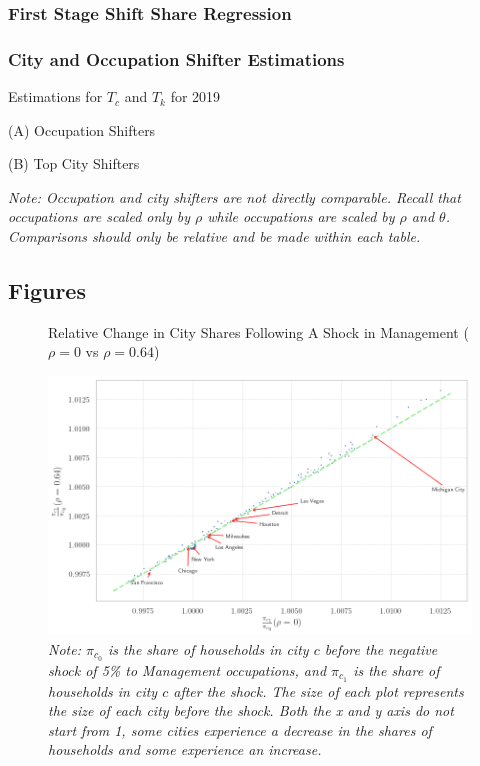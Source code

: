 \documentclass[10pt]{article}
\begin{document}
\subsubsection{First Stage Shift Share Regression}


\newpage

\subsubsection{City and Occupation Shifter Estimations}
\begin{table}[!htb]
    \centering
    \caption{Estimations for $T_c$ and $T_k$ for 2019}
    \begin{minipage}{0.4\textwidth}
        \centering
        \caption*{(A) Occupation Shifters}
        
    \end{minipage}
    \hfill
    \begin{minipage}{0.55\textwidth}
        \centering
        \caption*{(B) Top City Shifters}
        
    \end{minipage}
    \caption*{\small\textit{Note: Occupation and city shifters are not directly comparable. Recall that occupations are scaled only by $\rho$ while occupations are scaled by $\rho$ and $\theta$. Comparisons should only be relative and be made within each table.}}
\end{table}

\newpage

\subsection{Figures}

\begin{figure}[!htb]
    \centering
    \caption{Relative Change in City Shares Following A Shock in Management ($\rho = 0$ vs $\rho = 0.64$)}
    \includegraphics[width=\textwidth]{../../estimations/graphs/occ_shock.png}
    \caption*{\small\textit{Note: $\pi_{c_0}$ is the share of households in city $c$ before the negative shock of 5\% to Management occupations, and $\pi_{c_1}$ is the share of households in city $c$ after the shock. The size of each plot represents the size of each city before the shock. Both the x and y axis do not start from 1, some cities experience a decrease in the shares of households and some experience an increase.}}
\end{figure}
\end{document}
